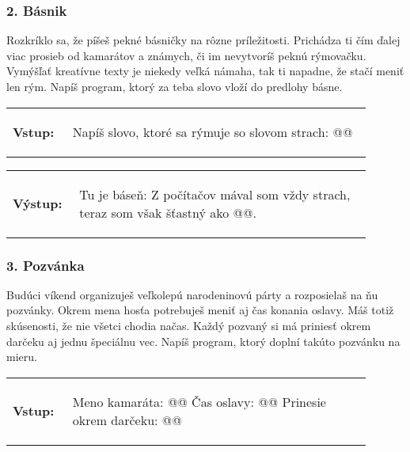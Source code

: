 \subsubsection*{2. Básnik}
Rozkríklo sa, že píšeš pekné básničky na rôzne príležitosti. Prichádza ti čím ďalej viac prosieb od kamarátov a známych, či im nevytvoríš peknú rýmovačku. Vymýšľať kreatívne texty je niekedy veľká námaha, tak ti napadne, že stačí meniť len rým. Napíš program, ktorý za teba slovo vloží do predlohy básne.

\begin{tabular}{@{}p{0.15\linewidth}p{0.75\linewidth}}
\textbf{\small Vstup:} &
\vspace{-3em}
\begin{code}
Napíš slovo, ktoré sa rýmuje so slovom strach: @\fbox{\phantom{slovo}}@
\end{code}
\end{tabular}

\vspace{-2em}
\begin{tabular}{@{}p{0.15\linewidth}p{0.75\linewidth}}
\textbf{\small Výstup:} &
\vspace{-3em}
\begin{code}
Tu je báseň:
Z počítačov mával som vždy strach,
teraz som však šťastný ako @\fbox{\phantom{slovo}}@.
\end{code}
\end{tabular}
\vspace{-2em}

\subsubsection*{3. Pozvánka}
Budúci víkend organizuješ veľkolepú narodeninovú párty a rozposielaš na ňu pozvánky. Okrem mena hosťa potrebuješ meniť aj čas konania oslavy. Máš totiž skúsenosti, že nie všetci chodia načas. Každý pozvaný si má priniesť okrem darčeku aj jednu špeciálnu vec. Napíš program, ktorý doplní takúto pozvánku na mieru.

\begin{tabular}{@{}p{0.15\linewidth}p{0.75\linewidth}}
\textbf{\small Vstup:} &
\vspace{-3em}
\begin{code}
Meno kamaráta: @\fbox{\phantom{vstup}}@
Čas oslavy: @\fbox{\phantom{vstup}}@
Prinesie okrem darčeku: @\fbox{\phantom{vstup}}@
\end{code}
\end{tabular}

